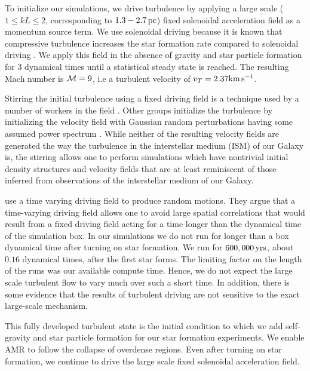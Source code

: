 \documentclass[../dissertation.tex]{subfiles}
\begin{document}
To initialize our simulations, we drive turbulence by applying a large scale 
($1 \le kL \le 2$, corresponding to $1.3 - 2.7 \, {\rm pc}$) fixed solenoidal acceleration field as a momentum
source term. 
We use solenoidal driving because it is known that compressive turbulence increases the star formation rate compared to solenoidal driving \citep{2008ApJ...688L..79F}.
We apply this field in the absence of gravity and star particle formation for 3 dynamical times until a statistical steady state is reached.
The resulting Mach number is ${\cal M} = 9$, i.e a turbulent velocity of $v_T = 2.37 {\rm km \, s^{-1}}$.

Stirring the initial turbulence using a fixed driving field is a
technique used by a number of workers in the field
\citep{2011ApJ...730...40P,2011ApJ...731...59C}.  Other groups
initialize the turbulence by initializing the velocity field with
Gaussian random perturbations having some assumed power spectrum
\citep{2014MNRAS.439.3420M,2015ApJ...809..187S}.  While neither of the
resulting velocity fields are generated the way the turbulence in the
interstellar medium (ISM) of our Galaxy is, the stirring allows one to
perform simulations which have nontrivial initial density structures
and velocity fields that are at least reminiscent of those inferred
from observations of the interstellar medium of our Galaxy.

\citet{2012ApJ...761..156F} use a time varying driving field to produce random motions.  They argue that a time-varying driving field allows one to avoid large spatial correlations that would result from a fixed driving field acting for a time longer than the dynamical time of the simulation box. 
In our simulations we do not run for longer than a box dynamical time after turning on star formation. 
We run for $600,000  \, {\rm yrs}$, about $0.16$ dynamical times, after the first star forms.
The limiting factor on the length of the runs was our available compute time.
Hence, we do not expect the large scale turbulent flow to vary much over such a short time.
In addition, there is some evidence \citep{2010A&A...512A..81F} that the results of turbulent driving are not sensitive to the exact large-scale mechanism.
 

This fully developed turbulent state is the initial condition to 
which we add self-gravity and star particle formation for our star 
formation experiments. We enable AMR to follow the collapse of overdense regions.
Even after turning on star formation, we continue to drive the large scale fixed solenoidal acceleration field.
\end{document}
